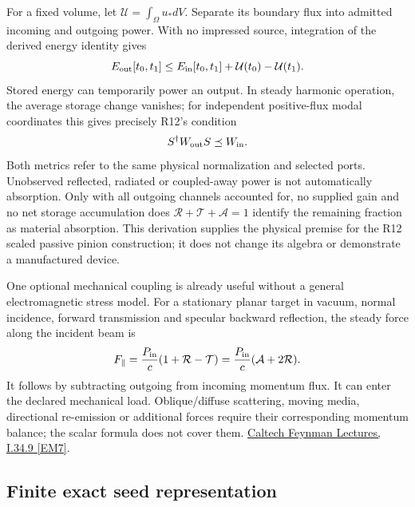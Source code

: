For a fixed volume, let $\mathcal U=\int_\Omega u_*dV$. Separate its boundary
flux into admitted incoming and outgoing power. With no impressed source,
integration of the derived energy identity gives
\begin{equation}
 E_{\rm out}[t_0,t_1]\le E_{\rm in}[t_0,t_1]
                   +\mathcal U(t_0)-\mathcal U(t_1).
 \label{eq:r13-em-transient-passive}
\end{equation}
Stored energy can temporarily power an output. In steady harmonic operation,
the average storage change vanishes; for independent positive-flux modal
coordinates this gives precisely R12's condition
\begin{equation}
 S^\dagger W_{\rm out}S\preceq W_{\rm in}.
 \label{eq:r13-em-passive-matrix}
\end{equation}
Both metrics refer to the same physical normalization and selected ports.
Unobserved reflected, radiated or coupled-away power is not automatically
absorption. Only with all outgoing channels accounted for, no supplied gain
and no net storage accumulation does $\mathcal R+\mathcal T+\mathcal A=1$
identify the remaining fraction as material absorption. This derivation
supplies the physical premise for the R12 scaled passive pinion construction;
it does not change its algebra or demonstrate a manufactured device.

One optional mechanical coupling is already useful without a general
electromagnetic stress model. For a stationary planar target in vacuum,
normal incidence, forward transmission and specular backward reflection,
the steady force along the incident beam is
\begin{equation}
 F_\parallel=\frac{P_{\rm in}}{c}(1+\mathcal R-\mathcal T)
            =\frac{P_{\rm in}}{c}(\mathcal A+2\mathcal R).
 \label{eq:r13-em-pressure}
\end{equation}
It follows by subtracting outgoing from incoming momentum flux. It can enter
the declared mechanical load. Oblique/diffuse scattering, moving media,
directional re-emission or additional forces require their corresponding
momentum balance; the scalar formula does not cover them.
\href{https://www.feynmanlectures.caltech.edu/I_34.html}{Caltech Feynman Lectures, I.34.9 [EM7]}.

\subsection{Finite exact seed representation}
\label{sec:r13-em-finite}

